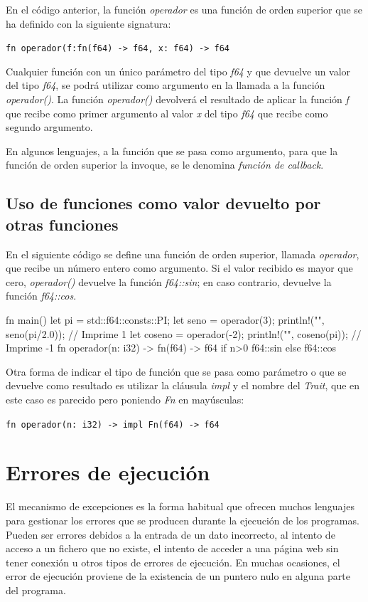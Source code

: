 En el código anterior, la función \textit{operador} es una función de orden superior que se ha definido con la siguiente signatura:

{\centering \texttt{fn operador(f:fn(f64) -> f64, x: f64) -> f64} \par}

Cualquier función con un único parámetro del tipo \textit{f64} y que devuelve un valor del tipo \textit{f64}, se podrá utilizar como argumento en la llamada a la función \textit{operador()}. La función \textit{operador()} devolverá el resultado de aplicar la función \textit{f} que recibe como primer argumento al valor \textit{x} del tipo \textit{f64} que recibe como segundo argumento.

En algunos lenguajes, a la función que se pasa como argumento, para que la función de orden superior la invoque, se le denomina \textit{función de callback}. 

\subsection{Uso de funciones como valor devuelto por otras funciones}
\noindent En el siguiente código se define una función de orden superior, llamada \textit{operador}, que recibe un número entero como argumento. Si el valor recibido es mayor que cero, \textit{operador()} devuelve la función \textit{f64::sin}; en caso contrario, devuelve la función \textit{f64::cos}.

\vspace{0.7em}
\begin{Codigo}
   fn main() {
      let pi = std::f64::consts::PI;
      let seno = operador(3);
      println!("{}", seno(pi/2.0)); // Imprime 1
      let coseno = operador(-2);
      println!("{}", coseno(pi)); // Imprime -1
   }
   fn operador(n: i32) -> fn(f64) -> f64 {
      if n>0 {f64::sin} else {f64::cos}
   }
\end{Codigo}

Otra forma de indicar el tipo de función que se pasa como parámetro o que se devuelve como resultado es utilizar la cláusula \textit{impl} y el nombre del \textit{Trait}, que en este caso es parecido pero poniendo \textit{Fn} en mayúsculas:

{\centering \texttt{fn operador(n: i32){ }->{ }impl Fn(f64) -> f64} \par}

\section{Errores de ejecución}
\noindent El mecanismo de excepciones es la forma habitual que ofrecen muchos lenguajes para gestionar los errores que se producen durante la ejecución de los programas. Pueden ser errores debidos a la entrada de un dato incorrecto, al intento de acceso a un fichero que no existe, el intento de acceder a una página web sin tener conexión u otros tipos de errores de ejecución. En muchas ocasiones, el error de ejecución proviene de la existencia de un puntero nulo en alguna parte del programa.

